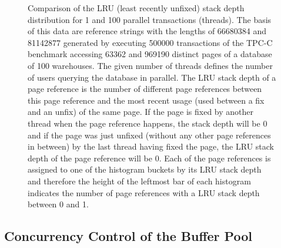 \begin{@empty}
\begin{figure}[ht!]
		\caption{Comparison of the LRU (least recently unfixed) stack depth distribution for 1 and 100 parallel transactions (threads). The basis of this data are reference strings with the lengths of \num{66680384} and \num{81142877} generated by executing \num{500000} transactions of the TPC-C benchmark accessing \num{63362} and \num{969190} distinct pages of a database of 100 warehouses. The given number of threads defines the number of users querying the database in parallel. The LRU stack depth of a page reference is the number of different page references between this page reference and the most recent usage (used between a fix and an unfix) of the same page. If the page is fixed by another thread when the page reference happens, the stack depth will be 0 and if the page was just unfixed (without any other page references in between) by the last thread having fixed the page, the LRU stack depth of the page reference will be 0. Each of the page references is assigned to one of the histogram buckets by its LRU stack depth and therefore the height of the leftmost bar of each histogram indicates the number of page references with a LRU stack depth between 0 and 1.}
		\label{fig:locality}
	\end{figure}
\end{@empty}
		
\subsection[Concurrency Control]{Concurrency Control of the Buffer Pool}

